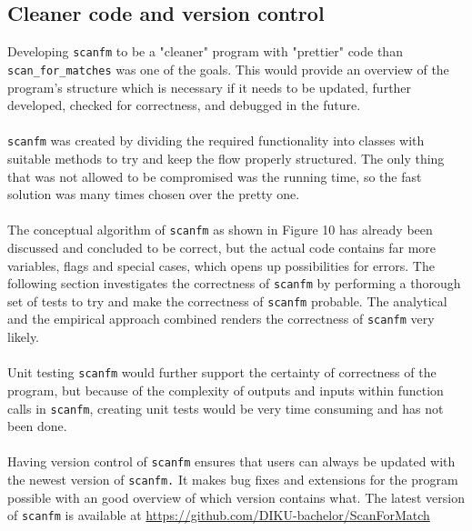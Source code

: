 \documentclass[12pt]{article}
\newcommand{\scm}{\texttt{scan\_for\_matches} }
\newcommand{\sfm}{\texttt{scanfm} }
\newcommand{\sfmp}{\texttt{scanfm.} }
\begin{document}
\subsection{Cleaner code and version control}
Developing \sfm to be a "cleaner" program with "prettier" code than \scm was one of the goals.
This would provide an overview of the program's
structure which is necessary if it needs to be updated, further developed,
checked for correctness, and debugged in the future. \\ \\
\sfm was created by dividing the required functionality into classes with suitable methods to try and keep the flow
properly structured. The only thing that was not allowed to be compromised was the running time, 
so the fast solution was many times chosen over the pretty one. \\ \\
The conceptual algorithm of \sfm as shown in Figure 10 has already been discussed and concluded to be correct, 
but the actual code contains far more variables, flags and special cases, which opens up possibilities for errors.
The following section investigates the correctness of \sfm by performing a thorough set of tests to try
and make the correctness of \sfm probable. The analytical and the empirical approach combined renders the correctness
of \sfm very likely. \\ \\
Unit testing \sfm would further support the certainty of correctness of the program, but because
of the complexity of outputs and inputs within function calls in \texttt{scanfm}, 
creating unit tests would be very time consuming and has not been done. \\ \\
Having version control of \sfm ensures that users can always be updated with the newest version of \sfmp
It makes bug fixes and extensions for the program possible with an good overview of which version contains what.
The latest version of \sfm is available at \url{https://github.com/DIKU-bachelor/ScanForMatch}
\end{document}
